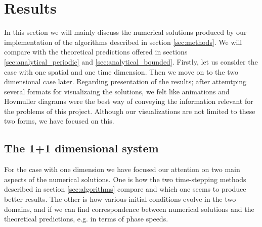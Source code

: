 \documentclass[12pt]{article}
\numberwithin{figure}{section}
\numberwithin{table}{section}
\begin{document}
\section{Results} \label{sec:results}
In this section we will mainly discuss the numerical solutions produced by our implementation of the algorithms described in section \ref{sec:methods}. We will compare with the theoretical predictions offered in sections \ref{sec:analytical_periodic} and \ref{sec:analytical_bounded}. Firstly, let us consider the case with one spatial and one time dimension. Then we move on to the two dimensional case later. Regarding presentation of the results; after attemtping several formats for visualizaing the solutions, we felt like animations and Hovmuller diagrams were the best way of conveying the information relevant for the problems of this project. Although our visualizations are not limited to these two forms, we have focused on this.

\subsection{The 1+1 dimensional system} \label{sec:results_1d}
For the case with one dimension we have focused our attention on two main aspects of the numerical solutions. One is how the two time-stepping methods described in section \ref{sec:algorithms} compare and which one seems to produce better results. The other is how various initial conditions evolve in the two domains, and if we can find correspondence between numerical solutions and the theoretical predictions, e.g. in terms of phase speeds.
\end{document}
